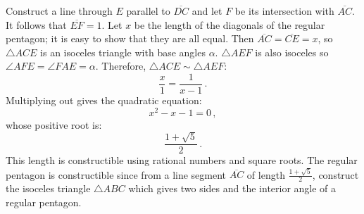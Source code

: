 \documentclass[11pt,a4paper]{article}
\newcommand*{\disfrac}[2]{\displaystyle\frac{#1}{#2}}
\begin{document}
\begin{center}
\end{center}

Construct a line through $E$ parallel to $\overline{DC}$ and let $F$ be its intersection with $\overline{AC}$. It follows that $\overline{EF}=1$.
Let $x$ be the length of the diagonals of the regular pentagon; it is easy to show that they are all equal. Then $\overline{AC}=\overline{CE}=x$, so $\triangle ACE$ is an isoceles triangle with base angles $\alpha$. $\triangle AEF$ is also isoceles so $\angle AFE=\angle FAE=\alpha$. Therefore, $\triangle ACE\sim\triangle AEF$:
\[
\disfrac{x}{1}=\disfrac{1}{x-1}\,.
\]
Multiplying out gives the quadratic equation:
\[
x^2-x-1=0\,,
\]
whose positive root is:
\[
\disfrac{1+\sqrt{5}}{2}\,.
\]
This length is constructible using rational numbers and square roots. The regular pentagon is constructible since from a line segment $\overline{AC}$ of length $\frac{1+\sqrt{5}}{2}$, construct the isoceles triangle $\triangle ABC$ which gives two sides and the interior angle of a regular pentagon.
\newpage



\end{document}
